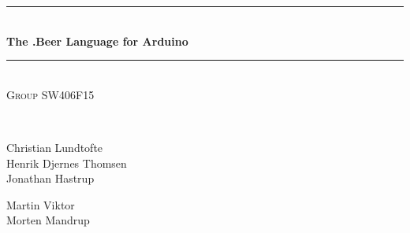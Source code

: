 \documentclass[pdftex,12pt,a4paper]{report}
\newcommand{\HRule}{\rule{\linewidth}{0.5mm}}
\begin{document}
\begin{titlepage}
\begin{center}


\HRule \\[0.4cm]
{ \huge \bfseries The .Beer Language for Arduino\\[0.4cm] }

\HRule \\[1.5cm]

\textsc{Group SW406F15}

\begin{figure}[!h]
	\centering
\end{figure}

\textsc{\Large }\\[0.5cm]
\begin{minipage}{0.4\textwidth}
\begin{flushleft} \large
Christian Lundtofte\\
Henrik Djernes Thomsen\\
Jonathan Hastrup\\
\end{flushleft}
\end{minipage}
\begin{minipage}{0.4\textwidth}
\begin{flushright} \large
Martin Viktor\\
Morten Mandrup
\end{flushright}
\end{minipage}

\vfill



\end{center}
\end{titlepage}
\end{document}
